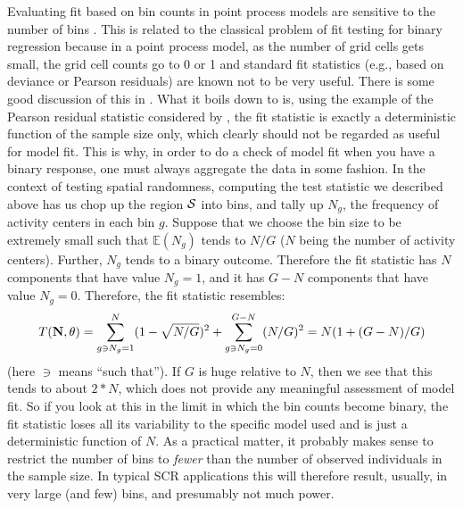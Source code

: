 Evaluating fit based on bin counts in point process models are
sensitive to the number of bins \citep[][p. 87-88]{illian_etal:2008}.
This is related to the classical problem of fit testing for binary
regression because in a point process model, as the number of grid
cells gets small, the grid cell counts go to 0 or 1 and standard fit
statistics (e.g., based on deviance or Pearson residuals) are known
not to be very useful.  There is some good discussion of this in
\citet[][Sec. 4.4.5]{mccullagh_nelder:1989}.
 What it boils down to is, using
the example of the Pearson residual statistic considered by
\citet{mccullagh_nelder:1989}, the fit statistic is exactly a
deterministic function of the sample size only, which clearly should
not be regarded as useful for model fit. This is why, in order to do a
check of model fit when you have a binary response, one must always
aggregate the data in some fashion.  In the context of testing spatial
randomness, computing the test statistic we described above has us chop up the
region ${\cal S}$ into bins, and tally up $N_{g}$, the
frequency of activity centers in each bin $g$.  %
Suppose that we choose the
bin size to be extremely small such that %
$\mathbb{E}(N_{g})$
tends to $N/G$ ($N$ being the number of activity centers).  Further,
$N_{g}$ tends to a binary outcome. Therefore the fit statistic has $N$
components that have value $N_{g} = 1$, and it has
 $G-N$
components that have value $N_{g} = 0$. Therefore, the fit statistic
resembles:
\[
T({\bf N},\theta) = \sum_{g \ni N_{g} = 1}^{N}  (1 - \sqrt{N/G})^2 +
\sum_{g \ni N_{g} = 0}^{G-N} (N/G)^2
 = N(1 + (G-N)/G)
\]
(here $\ni$ means ``such that''). If $G$ is huge
relative to $N$, then we see that this tends to about $2*N$, which
does not provide any meaningful assessment of model fit.  So if you
look at this in the limit in which the bin counts become binary, the
fit statistic loses all its variability to the specific model used and
is just a deterministic function of $N$. As a practical matter, it
probably makes sense to restrict the number of bins to {\it fewer}
than the number of observed individuals in the sample size. In typical
SCR
applications this will therefore result, usually, in very large (and
few) bins, and presumably not much power.



